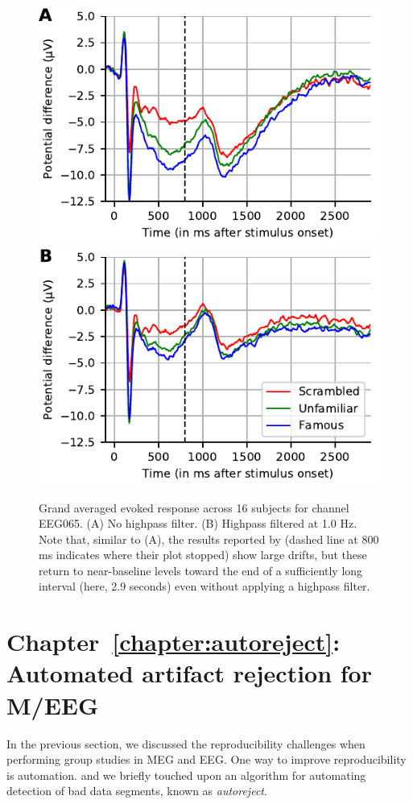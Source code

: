 \begin{figure}[htb]
  \centering
  \includegraphics[width=0.7\linewidth]{figures/grand_average_highpass-NoneHz.pdf}\\
  \includegraphics[width=0.7\linewidth]{figures/grand_average_highpass-1Hz.pdf}
\caption[]{Grand averaged evoked response across 16 subjects for channel EEG065.
(A) No highpass filter. (B) Highpass filtered at 1.0 Hz. Note that, similar to (A), the results reported by \cite{wakeman2015multi} (dashed line at 800 ms indicates where their plot stopped) show large drifts, but these return to near-baseline levels toward the end of a sufficiently long interval (here, 2.9 seconds) even without applying a highpass filter.}
\label{fig:sommaire:grand_average}
\end{figure}  

\clearpage

\section*{Chapter~\ref{chapter:autoreject}: Automated artifact rejection for M/EEG}

In the previous section, we discussed the reproducibility challenges when performing group studies in \ac{MEG} and \ac{EEG}. One way to improve reproducibility is automation. and we briefly touched upon an algorithm for automating detection of bad data segments, known as \emph{autoreject}.


